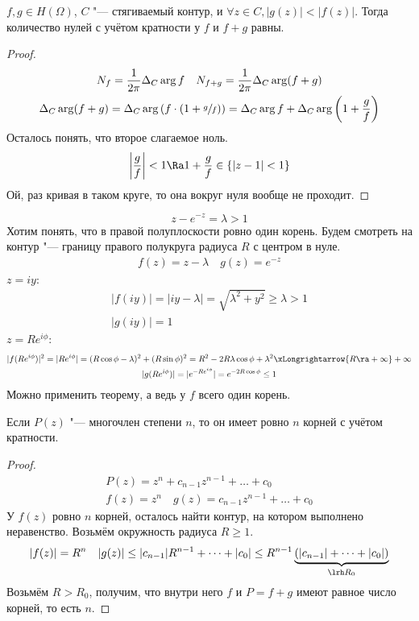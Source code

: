 \begin{theorem}[Руме]
	$f, g \in H(\Omega)$, $C$ "--- стягиваемый контур, и $\forall z \in C, |g(z)| < |f(z)|$.
	Тогда количество нулей с учётом кратности у $f$ и $f + g$ равны.
\end{theorem}
\begin{proof}
	\begin{gather*}
		N_f = \frac1{2\pi} \Delta_C \arg f \quad N_{f+g} = \frac1{2\pi} \Delta_C \arg(f+g) \\
		\Delta_C \arg(f+g)
		= \Delta_C \arg \left(f\cdot\left(1 + \sfrac gf\right)\right)
		= \Delta_C \arg f + \Delta_C \arg \left(1 + \frac gf\right)
	\end{gather*}
	Осталось понять, что второе слагаемое ноль.
	\begin{gather*}
		\left|\frac gf\right| < 1 \Ra 1 + \frac gf \in \{|z - 1| < 1\}
	\end{gather*}
	Ой, раз кривая в таком круге, то она вокруг нуля вообще не проходит.
\end{proof}

\begin{exmp}
	\[ z - e^{-z} = \lambda > 1 \]
	Хотим понять, что в правой полуплоскости ровно один корень.
	Будем смотреть на контур "--- границу правого полукруга радиуса $R$ с центром в нуле.
	\begin{gather*}
		f(z) = z - \lambda \quad g(z) = e^{-z}
	\end{gather*}
	$z = iy$:
	\begin{gather*}
		|f(iy)| = |iy - \lambda| = \sqrt{\lambda^2+y^2} \ge \lambda > 1 \\
		|g(iy)| = 1
	\end{gather*}
	$z = Re^{i\phi}$:
	\begin{gather*}
		|f(Re^{i\phi})|^2
		= |Re^{i\phi}|
		= (R\cos \phi - \lambda)^2 + (R\sin \phi)^2
		= R^2 - 2R\lambda \cos \phi + \lambda^2 \xLongrightarrow{R \ra +\infty} +\infty \\
		|g(Re^{i\phi})|
		= |e^{-Re^{i\phi}}|
		= e^{-2R\cos \phi} \le 1
	\end{gather*}
	Можно применить теорему, а ведь у $f$ всего один корень.
\end{exmp}

\begin{conseq}
	Если $P(z)$ "--- многочлен степени $n$, то он имеет ровно $n$ корней с учётом кратности.
\end{conseq}
\begin{proof}
	\begin{gather*}
		P(z) = z^n + c_{n-1}z^{n-1} + \dots + c_0 \\
		f(z) = z^n \quad g(z) = c_{n-1}z^{n-1} + \dots + c_0
	\end{gather*}
	У $f(z)$ ровно $n$ корней, осталось найти контур, на котором выполнено неравенство.
	Возьмём окружность радиуса $R \ge 1$.
	\begin{gather*}
		|f(z)| = R^n \quad
		|g(z)| \le |c_{n-1}| R^{n-1} + \dots + |c_0| \le R^{n-1} \underbrace{(|c_{n-1}| + \dots + |c_0|)}_{\lrh R_0}
	\end{gather*}
	Возьмём $R > R_0$, получим, что внутри него $f$ и $P = f+g$ имеют равное число корней, то есть $n$.
\end{proof}

